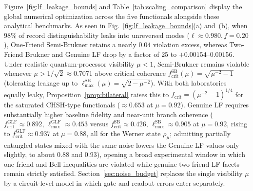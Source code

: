 Figure~\ref{fig:lf_leakage_bounds} and Table~\ref{tab:scaling_comparison} display the global numerical optimization across the five functionals alongside these analytical benchmarks. As seen in Fig.~\ref{fig:lf_leakage_bounds}(a) and~(b), when $98\%$ of record distinguishability leaks into unreversed modes ($\ell \approx 0.980, f = 0.20$), One-Friend Semi-Brukner retains a nearly $0.04$ violation excess, whereas Two-Friend Brukner and Genuine LF drop by a factor of $25$ to $+0.00154$--$0.00156$. Under realistic quantum-processor visibility $\mu < 1$, Semi-Brukner remains violable whenever $\mu > 1/\sqrt{2} \approx 0.7071$ above critical coherence $f_{\mathrm{crit}}^{\mathrm{SB}}(\mu) = \sqrt{\mu^{-2} - 1}$ (tolerating leakage up to $\ell_{\max}^{\mathrm{SB}}(\mu) = \sqrt{2 - \mu^{-2}}$). With both laboratories equally leaky, Proposition~\ref{prop:bilateral} raises this to $f_{\mathrm{crit}} = (\mu^{-2} - 1)^{1/4}$ for the saturated CHSH-type functionals ($\approx 0.653$ at $\mu = 0.92$). Genuine LF requires substantially higher baseline fidelity and near-unit branch coherence ($f_{\mathrm{crit}}^{\mathrm{GLF}} \approx 0.892$, $\ell_{\max}^{\mathrm{GLF}} \approx 0.453$ versus $f_{\mathrm{crit}}^{\mathrm{SB}} \approx 0.426$, $\ell_{\max}^{\mathrm{SB}} \approx 0.905$ at $\mu = 0.92$, rising to $f_{\mathrm{crit}}^{\mathrm{GLF}} \approx 0.937$ at $\mu = 0.88$, all for the Werner state $\rho_\mu$; admitting partially entangled states mixed with the same noise lowers the Genuine LF values only slightly, to about $0.88$ and $0.93$), opening a broad experimental window in which one-friend and Bell inequalities are violated while genuine two-friend LF facets remain strictly satisfied. Section~\ref{sec:noise_budget} replaces the single visibility $\mu$ by a circuit-level model in which gate and readout errors enter separately.
